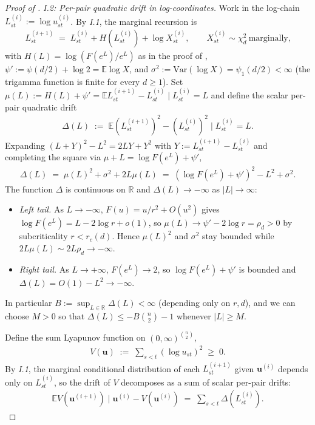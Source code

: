 \documentclass{article}
\newcommand{\RR}{\mathbb{R}}
\newcommand{\Brack}[1]{\left( #1 \right)}
\newcommand{\Exp}[1]{\mathbb{E} #1}
\newcommand{\cond}{\mid}
\newcommand{\bu}{\mathbf{u}}
\newcommand{\Var}{\mathrm{Var}}
\begin{document}
\begin{proof}[Proof of ]
  \emph{I.2: Per-pair quadratic drift in log-coordinates.} Work in the log-chain $L_{st}^{(i)} := \log u_{st}^{(i)}$. By \emph{I.1}, the marginal recursion is
  \begin{eqnarray*}
    L_{st}^{(i+1)} \;=\; L_{st}^{(i)} + H(L_{st}^{(i)}) + \log X_{st}^{(i)}, \qquad X_{st}^{(i)} \sim \chi^2_d \ \text{marginally,}
  \end{eqnarray*}
  with $H(L) = \log(F(e^L)/e^L)$ as in the proof of , $\psi' := \psi(d/2) + \log 2 = \Exp{\log X}$, and $\sigma^2 := \Var(\log X) = \psi_1(d/2) < \infty$ (the trigamma function is finite for every $d \ge 1$). Set $\mu(L) := H(L) + \psi' = \Exp{L_{st}^{(i+1)} - L_{st}^{(i)} \cond L_{st}^{(i)} = L}$ and define the scalar per-pair quadratic drift
  \begin{eqnarray*}
    \Delta(L) \;:=\; \Exp{(L_{st}^{(i+1)})^2 - (L_{st}^{(i)})^2 \cond L_{st}^{(i)} = L}.
  \end{eqnarray*}
  Expanding $(L + Y)^2 - L^2 = 2LY + Y^2$ with $Y := L_{st}^{(i+1)} - L_{st}^{(i)}$ and completing the square via $\mu + L = \log F(e^L) + \psi'$,
  \begin{eqnarray}
    \label{eq:per_pair_quad_drift}
    \Delta(L) \;=\; \mu(L)^2 + \sigma^2 + 2L\mu(L) \;=\; \Brack{\log F(e^L) + \psi'}^2 - L^2 + \sigma^2.
  \end{eqnarray}
  The function $\Delta$ is continuous on $\RR$ and $\Delta(L) \to -\infty$ as $|L| \to \infty$:
  \begin{itemize}
    \item[] \emph{Left tail.} As $L \to -\infty$, $F(u) = u/r^2 + O(u^2)$ gives $\log F(e^L) = L - 2\log r + o(1)$, so $\mu(L) \to \psi' - 2\log r = \rho_d > 0$ by subcriticality $r < r_c(d)$. Hence $\mu(L)^2$ and $\sigma^2$ stay bounded while $2L\mu(L) \sim 2L\rho_d \to -\infty$.
    \item[] \emph{Right tail.} As $L \to +\infty$, $F(e^L) \to 2$, so $\log F(e^L) + \psi'$ is bounded and $\Delta(L) = O(1) - L^2 \to -\infty$.
  \end{itemize}
  In particular $B := \sup_{L \in \RR} \Delta(L) < \infty$ (depending only on $r, d$), and we can choose $M > 0$ so that $\Delta(L) \le -B\binom{n}{2} - 1$ whenever $|L| \ge M$.

  Define the sum Lyapunov function on $(0,\infty)^{\binom{n}{2}}$,
  \begin{eqnarray*}
    V(\bu) \;:=\; \sum_{s<t} (\log u_{st})^2 \;\ge\; 0.
  \end{eqnarray*}
  By \emph{I.1}, the marginal conditional distribution of each $L_{st}^{(i+1)}$ given $\bu^{(i)}$ depends only on $L_{st}^{(i)}$, so the drift of $V$ decomposes as a sum of scalar per-pair drifts:
  \begin{eqnarray}
    \label{eq:sum_quad_drift}
    \Exp{V(\bu^{(i+1)}) \cond \bu^{(i)}} - V(\bu^{(i)}) \;=\; \sum_{s<t} \Delta(L_{st}^{(i)}).
  \end{eqnarray}


\end{proof}
\end{document}
